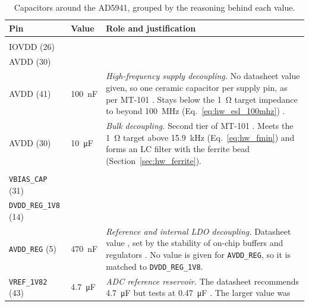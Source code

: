 \begin{table}[H]
  \centering
  \small
  \caption{Capacitors around the AD5941, grouped by the reasoning behind
    each value.}
  \label{tab:hw_caps}
  \renewcommand\tabularxcolumn[1]{m{#1}}
  \begin{tabularx}{\textwidth}{@{}l l >{\raggedright\arraybackslash}X@{}}
    \toprule
    \textbf{Pin} & \textbf{Value} & \textbf{Role and justification} \\
    \midrule
    \capstack{DVDD (6), $\times 2$ \\ IOVDD (26) \\ AVDD (30) \\ AVDD (41)}
      & \SI{100}{\nano\farad}
      & \textit{High-frequency supply decoupling.} No datasheet value given, so one
        ceramic capacitor per supply pin, as per MT-101 \cite{adi_mt101}. Stays
        below the \SI{1}{\ohm} target impedance to beyond
        \SI{100}{\mega\hertz} (Eq.~\eqref{eq:hw_esl_100mhz})
        \cite{smith1999pds}. \\
    \midrule
    AVDD (30) & \SI{10}{\micro\farad}
      & \textit{Bulk decoupling.} Second tier of MT-101 \cite{adi_mt101}.
        Meets the \SI{1}{\ohm} target above \SI{15.9}{\kilo\hertz}
        (Eq.~\eqref{eq:hw_fmin}) and forms an LC filter with the ferrite bead
        (Section~\ref{sec:hw_ferrite}). \\
    \midrule
    \capstack{\texttt{VREF\_2V5} (4) \\ \texttt{VBIAS\_CAP} (31) \\
              \texttt{DVDD\_REG\_1V8} (14) \\ \texttt{AVDD\_REG} (5)}
      & \SI{470}{\nano\farad}
      & \textit{Reference and internal LDO decoupling.} Datasheet value
        \cite[pp.~11, 20--21]{ad5941_ds}, set by the stability of on-chip
        buffers and regulators \cite{rinconmora2009ldo}. No value is given
        for \texttt{AVDD\_REG}, so it is matched to \texttt{DVDD\_REG\_1V8}. \\
    \midrule
    \texttt{VREF\_1V82} (43) & \SI{4.7}{\micro\farad}
      & \textit{ADC reference reservoir.} The datasheet recommends
        \SI{4.7}{\micro\farad} \cite[p.~19]{ad5941_ds} but tests at
        \SI{0.47}{\micro\farad} \cite[p.~11]{ad5941_ds}. The larger value was

\end{tabularx}
\end{table}
